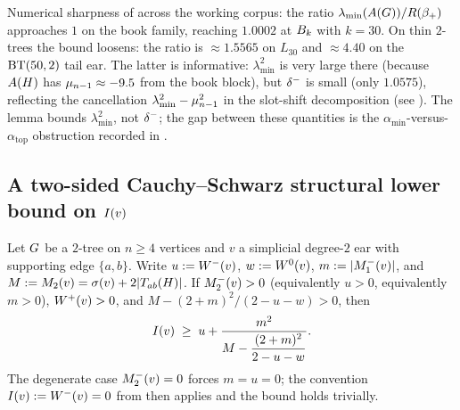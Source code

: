 \begin{remark}\label{rem:B1-sharpness}
Numerical sharpness of  across the working corpus: the
ratio $\lambda_{\min}(A(G)) / R(\beta_{+})$ approaches $1$ on
the book family, reaching $1.0002$ at $B_{k}$ with $k = 30$. On thin
$2$-trees the bound loosens: the ratio is $\approx 1.5565$ on $L_{30}$
and $\approx 4.40$ on the $\mathrm{BT}(50,2)$ tail ear. The latter is
informative: $\lambda_{\min}^{2}$ is very large there (because
$A(H)$ has $\mu_{n-1} \approx -9.5$ from the book block),
but $\delta^{-}$ is small (only $1.0575$), reflecting the cancellation
$\lambda_{\min}^{2} - \mu_{n-1}^{2}$ in the slot-shift decomposition
(see ). The lemma bounds $\lambda_{\min}^{2}$,
not $\delta^{-}$; the gap between these quantities is the
$\alpha_{\min}$-versus-$\alpha_{\text{top}}$ obstruction
recorded in .
\end{remark}

\subsection{A two-sided Cauchy--Schwarz structural lower bound on
\texorpdfstring{$I(v)$}{I(v)}}\label{sec:moment-form:cs-two-sided}

\begin{lemma}\label{lem:cs-two-sided}
Let $G$ be a $2$-tree on $n \ge 4$ vertices and $v$ a simplicial
degree-$2$ ear with supporting edge $\{a, b\}$. Write
$u := W^{-}(v)$, $w := W^{0}(v)$, $m := |M_{1}^{-}(v)|$, and
$M := M_{2}(v) = \sigma(v) + 2 |T_{ab}(H)|$. If
$M_{2}^{-}(v) > 0$ (equivalently $u > 0$, equivalently $m > 0$),
$W^{+}(v) > 0$, and $M - (2 + m)^{2}/(2 - u - w) > 0$, then
\[
I(v) \;\ge\; u + \frac{m^{2}}{M - \dfrac{(2 + m)^{2}}{2 - u - w}}.
\]
The degenerate case $M_{2}^{-}(v) = 0$ forces $m = u = 0$; the convention
$I(v) := W^{-}(v) = 0$ from  then applies and
the bound holds trivially.
\end{lemma}

